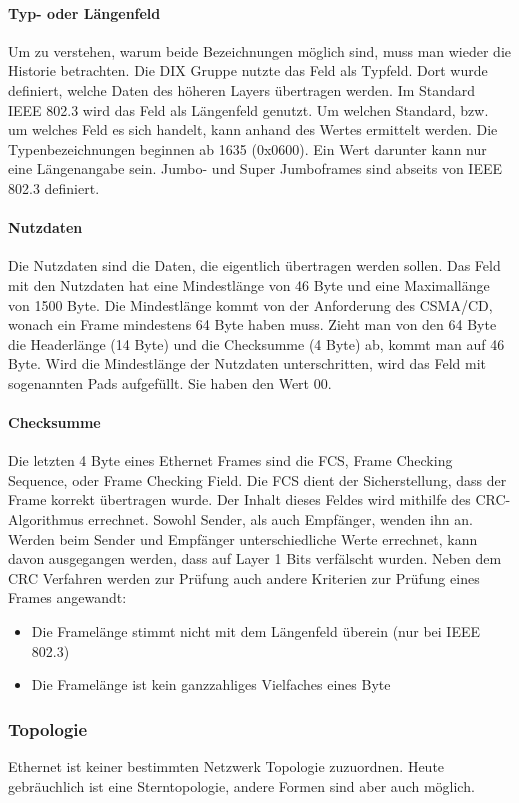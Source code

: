 \documentclass[12pt, a4paper, ngerman]{article}
\newcommand{\fcs}{FCS, Frame Checking Sequence,\xspace}
\begin{document}
\paragraph{Typ- oder Längenfeld}
Um zu verstehen, warum beide Bezeichnungen möglich sind, muss man wieder die Historie betrachten. Die DIX Gruppe nutzte das Feld als Typfeld. Dort wurde definiert, welche Daten des höheren Layers übertragen werden.  Im Standard IEEE 802.3 wird das Feld als Längenfeld genutzt. Um welchen Standard, bzw. um welches Feld es sich handelt, kann anhand des Wertes ermittelt werden. Die Typenbezeichnungen beginnen ab 1635 (0x0600). Ein Wert darunter kann nur eine Längenangabe sein. Jumbo- und Super Jumboframes sind abseits von IEEE 802.3 definiert.

\paragraph{Nutzdaten}
Die Nutzdaten sind die Daten, die eigentlich übertragen werden sollen. Das Feld mit den Nutzdaten hat eine Mindestlänge von 46 Byte  und eine Maximallänge von 1500 Byte. Die Mindestlänge kommt von der Anforderung des \mbox{CSMA/CD}, wonach ein Frame mindestens 64 Byte haben muss. Zieht man von den 64 Byte die Headerlänge (14 Byte) und die Checksumme (4 Byte) ab, kommt man auf 46 Byte. Wird die Mindestlänge der Nutzdaten unterschritten, wird das Feld mit sogenannten Pads aufgefüllt. Sie haben den Wert 00.
\paragraph{Checksumme \label{checksumme}}
Die letzten 4 Byte eines Ethernet Frames sind die \fcs oder Frame Checking Field. Die FCS dient der Sicherstellung, dass der Frame korrekt übertragen wurde. Der Inhalt dieses Feldes wird mithilfe des CRC-Algorithmus errechnet. Sowohl Sender, als auch Empfänger, wenden ihn an. Werden beim Sender und Empfänger unterschiedliche Werte errechnet, kann davon ausgegangen werden, dass auf Layer 1 Bits verfälscht wurden. Neben dem CRC Verfahren werden zur Prüfung auch andere Kriterien zur Prüfung eines Frames angewandt:
\begin{itemize}
	\item Die Framelänge stimmt nicht mit dem Längenfeld überein (nur bei IEEE 802.3)
	\item Die Framelänge ist kein ganzzahliges Vielfaches eines Byte
\end{itemize}


\subsubsection{Topologie}
Ethernet ist keiner bestimmten Netzwerk Topologie zuzuordnen. Heute gebräuchlich ist eine Sterntopologie, andere Formen sind aber auch möglich.   
\end{document}
